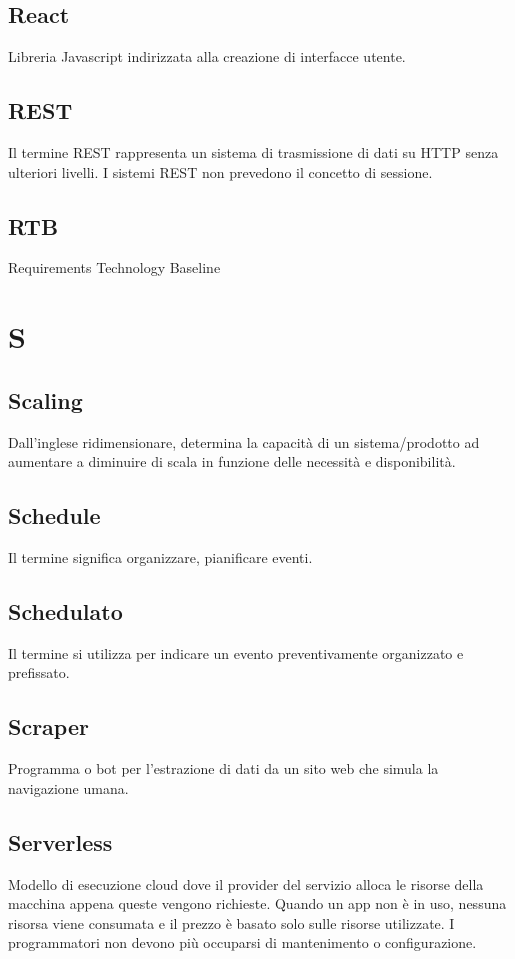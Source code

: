 \documentclass{classes/base}
\begin{document}
        \subsection*{React}
        Libreria Javascript indirizzata alla creazione di interfacce utente.

        \subsection*{REST}
        Il termine REST rappresenta un sistema di trasmissione di dati su HTTP senza ulteriori livelli. I sistemi REST non prevedono il concetto di sessione.

        \subsection*{RTB}
        Requirements Technology Baseline
        \newpage  
    \section{S}
        \subsection*{Scaling}       
        Dall'inglese ridimensionare, determina la capacità di un sistema/prodotto ad aumentare a diminuire di scala in funzione delle necessità e disponibilità.

        \subsection*{Schedule} 
        Il termine significa organizzare, pianificare eventi.

        \subsection*{Schedulato}
        Il termine si utilizza per indicare un evento preventivamente organizzato e prefissato.
        
        \subsection*{Scraper}
        Programma o bot per l'estrazione di dati da un sito web che simula la navigazione umana.
        
        \subsection*{Serverless}
        Modello di esecuzione cloud dove il provider del servizio alloca le risorse della macchina appena queste vengono richieste. Quando un app non è in uso, nessuna risorsa viene consumata e il prezzo è basato solo sulle risorse utilizzate. I programmatori non devono più occuparsi di mantenimento o configurazione.
\end{document}
